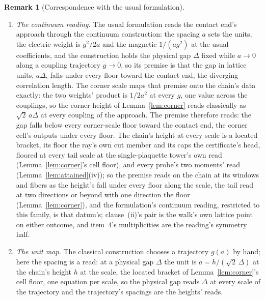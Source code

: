 \documentclass[11pt]{article}
\theoremstyle{definition}
\newtheorem{remark}{Remark}
\begin{document}
\begin{remark}[Correspondence with the usual formulation]
\begin{enumerate}[leftmargin=2em,itemsep=3pt]
\item \emph{The continuum reading.} The usual formulation reads the
contact end's approach through the continuum construction: the spacing $a$
sets the units, the electric weight is $g^2/2a$ and the magnetic
$1/(ag^2)$ at the usual coefficients, and the construction holds the
physical gap $\Delta$ fixed while $a\to0$ along a coupling
trajectory $g\to0$, so its premise is that the gap in lattice units,
$a\Delta$, falls under every floor toward the contact end, the diverging correlation
length. The corner scale maps that premise onto the chain's data
exactly: the two weights' product is $1/2a^2$ at every $g$, one value
across the couplings, so the corner height of
Lemma~\ref{lem:corner} reads classically as $\sqrt2\,a\Delta$ at
every coupling of the approach. The premise therefore reads: the
gap falls below every corner-scale floor toward the contact end, the
corner cell's outputs under every floor. The chain's height at
every scale is a located bracket, its floor the ray's own cut
member and its caps the certificate's head, floored at every tail
scale at the single-plaquette tower's own read
(Lemma~\ref{lem:corner}'s cell floor), and every probe's two
moments' read (Lemma~\ref{lem:attained}(iv)); so the premise reads
on the chain at its windows and fibers as the height's fall under
every floor along the scale, the tail read at two directions or
beyond with one direction the floor (Lemma~\ref{lem:corner}), and
the formulation's continuum
reading, restricted to this family, is that datum's;
clause~(ii)'s pair is the walk's own lattice point on
either outcome, and item~4's multiplicities are the reading's
symmetry half.

\item \emph{The unit map.} The classical construction chooses a
trajectory $g(a)$ by hand; here the spacing is a read: at a
physical gap $\Delta$ the unit is $a=h/(\sqrt2\,\Delta)$ at the
chain's height $h$ at the scale, the located bracket of
Lemma~\ref{lem:corner}'s cell floor, one equation per scale, so
the physical gap reads $\Delta$ at every scale of the trajectory
and the trajectory's spacings are the heights' reads.


\end{enumerate}
\end{remark}
\end{document}
